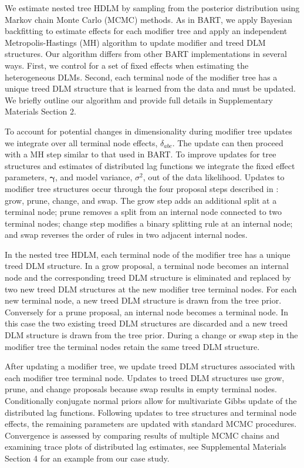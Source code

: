 \documentclass[12pt]{article}
\begin{document}
We estimate nested tree HDLM by sampling from the posterior distribution using Markov chain Monte Carlo (MCMC) methods. As in BART, we apply Bayesian backfitting \citep{Hastie2000} to estimate effects for each modifier tree and apply an independent Metropolis-Hastings (MH) algorithm to update modifier and treed DLM structures. Our algorithm differs from other BART implementations in several ways. First, we control for a set of fixed effects when estimating the heterogeneous DLMs. Second, each terminal node of the modifier tree has a unique treed DLM structure that is learned from the data and must be updated. We briefly outline our algorithm and provide full details in Supplementary Materials Section 2.

To account for potential changes in dimensionality during modifier tree updates we integrate over all terminal node effects, $\delta_{abc}$. The update can then proceed with a MH step similar to that used in BART. To improve updates for tree structures and estimates of distributed lag functions we integrate the fixed effect parameters, $\boldsymbol\gamma$, and model variance, $\sigma^2$, out of the data likelihood. Updates to modifier tree structures occur through the four proposal steps described in \cite{Chipman2012}: grow, prune, change, and swap. The grow step adds an additional split at a terminal node; prune removes a split from an internal node connected to two terminal nodes; change step modifies a binary splitting rule at an internal node; and swap reverses the order of rules in two adjacent internal nodes. 

In the nested tree HDLM, each terminal node of the modifier tree has a unique treed DLM structure. In a grow proposal, a terminal node becomes an internal node and the corresponding treed DLM structure is eliminated and replaced by two new treed DLM structures at the new modifier tree terminal nodes. For each new terminal node, a new treed DLM structure is drawn from the tree prior. Conversely for a prune proposal, an internal node becomes a terminal node. In this case the two existing treed DLM structures are discarded and a new treed DLM structure is drawn from the tree prior. During a change or swap step in the modifier tree the terminal nodes retain the same treed DLM structure. 

After updating a modifier tree, we update treed DLM structures associated with each modifier tree terminal node. Updates to treed DLM structures use grow, prune, and change proposals because swap results in empty terminal nodes. Conditionally conjugate normal priors allow for multivariate Gibbs update of the distributed lag functions. Following updates to tree structures and terminal node effects, the remaining parameters are updated with standard MCMC procedures. Convergence is assessed by comparing results of multiple MCMC chains and examining trace plots of distributed lag estimates, see Supplemental Materials Section 4 for an example from our case study.
\end{document}

